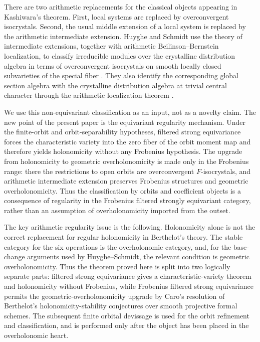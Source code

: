 \documentclass[11pt]{amsart}
\theoremstyle{plain}
\theoremstyle{definition}
\theoremstyle{remark}
\begin{document}
There are two arithmetic replacements for the classical objects appearing in
Kashiwara's theorem.  First, local systems are replaced by overconvergent
isocrystals.  Second, the usual middle extension of a local system is replaced
by the arithmetic intermediate extension.  Huyghe and Schmidt use the theory
of intermediate extensions, together with arithmetic Beilinson--Bernstein
localization, to classify irreducible modules over the crystalline
distribution algebra in terms of overconvergent isocrystals on smooth locally
closed subvarieties of the special fiber
\cite[Theorem 2.3.4]{HuygheSchmidtIntermediate}.  They also identify the
corresponding global section algebra with the crystalline distribution algebra
at trivial central character through the arithmetic localization theorem
\cite[Theorem 4.2.1]{HuygheSchmidtIntermediate}.

We use this non-equivariant classification as an input, not as a novelty claim.
The new point of the present paper is the equivariant regularity mechanism.
Under the finite-orbit and orbit-separability hypotheses, filtered strong equivariance forces the
characteristic variety into the zero fiber of the orbit moment map and therefore
yields holonomicity without any Frobenius hypothesis.  The upgrade from
holonomicity to geometric overholonomicity is made only in the Frobenius range:
there the restrictions to open orbits are overconvergent \(F\)-isocrystals, and
arithmetic intermediate extension preserves Frobenius structures and
geometric overholonomicity.  Thus the classification by orbits and coefficient
objects is a consequence of regularity in the Frobenius filtered strongly
equivariant category, rather than an assumption of overholonomicity imported
from the outset.

The key arithmetic regularity issue is the following.  Holonomicity alone is not
the correct replacement for regular holonomicity in Berthelot's theory.  The
stable category for the six operations is the overholonomic category, and, for
the base-change arguments used by Huyghe--Schmidt, the relevant condition is
geometric overholonomicity.  Thus the theorem proved here is split into two logically separate parts:
filtered strong equivariance gives a characteristic-variety theorem and
holonomicity without Frobenius, while Frobenius filtered strong equivariance
permits the geometric-overholonomicity upgrade by Caro's resolution of Berthelot's holonomicity-stability conjectures over smooth projective formal schemes.  The subsequent finite orbital devissage is used for
the orbit refinement and classification, and is performed only after the object
has been placed in the overholonomic heart.
\end{document}

